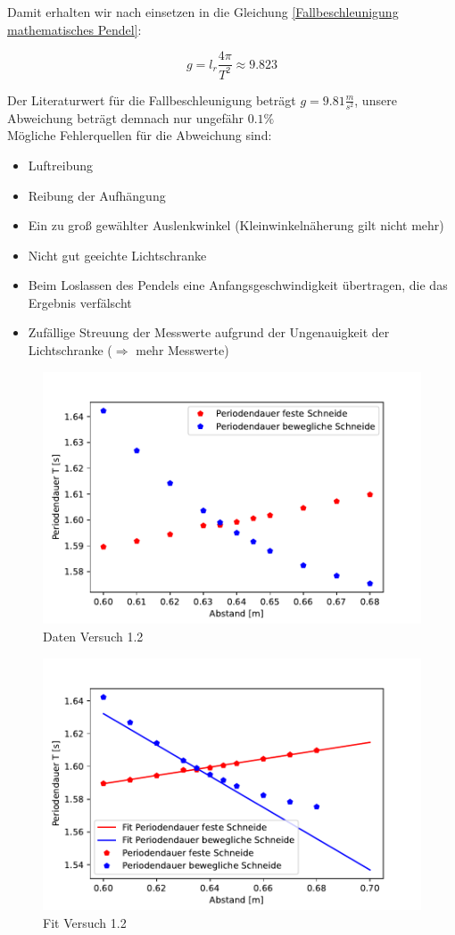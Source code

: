 Damit erhalten wir nach einsetzen in die Gleichung \ref{Fallbeschleunigung mathematisches Pendel}:

$$ g = l_r \frac{4 \pi}{T^2} \approx 9.823 $$

Der Literaturwert für die Fallbeschleunigung beträgt $g=9.81 \frac{m}{s^2}$, unsere Abweichung beträgt demnach nur ungefähr $0.1 \% $\\
Mögliche Fehlerquellen für die Abweichung sind:
\begin{itemize}
    \item Luftreibung
    \item Reibung der Aufhängung
    \item Ein zu groß gewählter Auslenkwinkel (Kleinwinkelnäherung gilt nicht mehr)
    \item Nicht gut geeichte Lichtschranke
    \item Beim Loslassen des Pendels eine Anfangsgeschwindigkeit übertragen, die das Ergebnis verfälscht
    \item Zufällige Streuung der Messwerte aufgrund der Ungenauigkeit der Lichtschranke ($\Rightarrow$ mehr Messwerte)
\end{itemize}

\begin{figure}[ht]
    \centering
    \includegraphics[scale=0.8]{Pendel/Protokoll/fig/Pendel Versuch 1.2.pdf}
    \caption{Daten Versuch 1.2}
    \label{fig:Pendel Versuch 1.1}
\end{figure}

\begin{figure}[ht]
    \centering
    \includegraphics[scale=0.8]{Pendel/Protokoll/fig/Pendel Versuch 1.2 Fit.pdf}
    \caption{Fit Versuch 1.2}
    \label{fig:Pendel Versuch 1.1 Fit}
\end{figure}